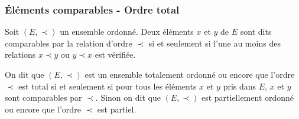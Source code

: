 \subsubsection{Éléments comparables - Ordre total}
\label{chap3-subsubsec:ordretotal}
\begin{defdef}
    Soit \((E, \prec)\) un ensemble ordonné. Deux éléments \(x\) et \(y\) de 
    \(E\) sont dits comparables par la relation d'ordre \(\prec\) si et 
    seulement si l'une au moins des relations \(x \prec y\) ou \(y \prec x\) est 
    vérifiée.
\end{defdef}
\begin{defdef}
    On dit que \((E, \prec)\) est un ensemble totalement ordonné ou encore que 
    l'ordre \(\prec\) est total si et seulement si pour tous les éléments \(x\) 
    et \(y\) pris dans \(E\), \(x\) et \(y\) sont comparables par \(\prec\). 
    Sinon on dit que \((E,\prec)\) est partiellement ordonné ou encore que 
    l'ordre \(\prec\) est partiel.
\end{defdef}
